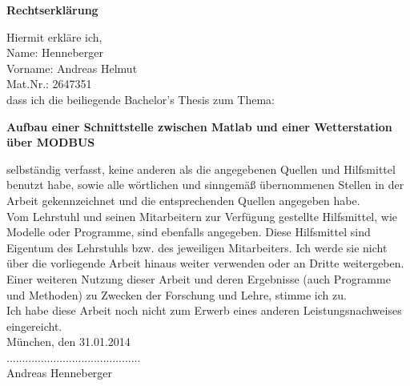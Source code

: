 \begin{Huge}
\noindent \textbf{Rechtserklärung}\vspace{1cm}\\
\end{Huge}
\noindent Hiermit erkläre ich,\\
Name: Henneberger\\
Vorname: Andreas Helmut\\
Mat.Nr.: 2647351\vspace{0.4cm}\\
dass ich die beiliegende Bachelor's Thesis zum Thema:\vspace{0.5cm}\\
\begin{center}
\textbf{Aufbau einer Schnittstelle zwischen Matlab und einer Wetterstation über MODBUS}
\end{center}\vspace{0.4cm}
selbständig verfasst, keine anderen als die angegebenen Quellen und Hilfsmittel benutzt habe,
sowie alle wörtlichen und sinngemäß übernommenen Stellen in der Arbeit gekennzeichnet und die 
entsprechenden Quellen angegeben habe.\\
Vom Lehrstuhl und seinen Mitarbeitern zur Verfügung gestellte Hilfsmittel, wie Modelle oder
Programme, sind ebenfalls angegeben. Diese Hilfsmittel sind Eigentum des Lehrstuhls bzw. des
jeweiligen Mitarbeiters. Ich werde sie nicht über die vorliegende Arbeit hinaus weiter verwenden
oder an Dritte weitergeben.\vspace{0.5cm}\\

\noindent Einer weiteren Nutzung dieser Arbeit und deren Ergebnisse (auch Programme und Methoden) zu Zwecken
der Forschung und Lehre, stimme ich zu.\vspace{0.5cm}\\

\noindent Ich habe diese Arbeit noch nicht zum Erwerb eines anderen Leistungsnachweises eingereicht.\vspace{0.5cm}\\

\noindent München, den 31.01.2014 \vspace{0.5cm}\\
\noindent ...........................................\\
Andreas Henneberger
